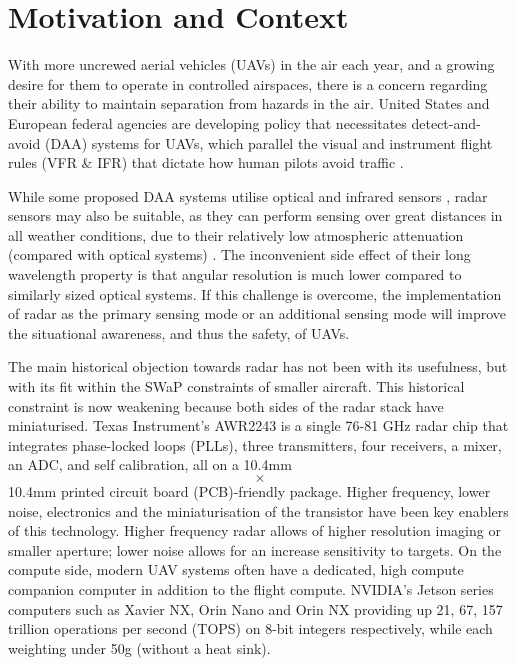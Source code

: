 \section{Motivation and Context}
With more uncrewed aerial vehicles (UAVs) in the air each year, and a growing desire for them to operate in controlled airspaces, there is a concern regarding their ability to maintain separation from hazards in the air. United States and European federal agencies are developing policy that necessitates detect-and-avoid (DAA) systems for UAVs, which parallel the visual and instrument flight rules (VFR \& IFR) that dictate how human pilots avoid traffic \cite{easa_easy_access_uas_2024} \cite{rtca_sc228_2025} \cite{serres_wu_2021_nasa_tm}.

While some proposed DAA systems utilise optical and infrared sensors \cite{serres_wu_2021_nasa_tm}, radar sensors may also be suitable, as they can perform sensing over great distances in all weather conditions, due to their relatively low atmospheric attenuation (compared with optical systems) \cite{borden_radar_imaging_airborne_targets_1999}. The inconvenient side effect of their long wavelength property is that angular resolution is much lower compared to similarly sized optical systems. If this challenge is overcome, the implementation of radar as the primary sensing mode or an additional sensing mode will improve the situational awareness, and thus the safety, of UAVs.

The main historical objection towards radar has not been with its usefulness, but with its fit within the SWaP constraints of smaller aircraft. This historical constraint is now weakening because both sides of the radar stack have miniaturised. Texas Instrument's AWR2243 is a single 76-81 GHz radar chip that integrates phase-locked loops (PLLs), three transmitters, four receivers, a mixer, an ADC, and self calibration, all on a 10.4mm \[\times\] 10.4mm printed circuit board (PCB)-friendly package. Higher frequency, lower noise, electronics and the miniaturisation of the transistor have been key enablers of this technology. Higher frequency radar allows of higher resolution imaging or smaller aperture; lower noise allows for an increase sensitivity to targets. On the compute side, modern UAV systems often have a dedicated, high compute companion computer in addition to the flight compute. NVIDIA's Jetson series computers such as Xavier NX, Orin Nano and Orin NX providing up 21, 67, 157 trillion operations per second (TOPS) on 8-bit integers respectively, while each weighting under 50g (without a heat sink). 

